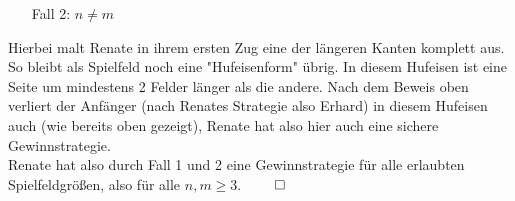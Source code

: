 \documentclass[12pt,a4paper,oneside]{article}
\begin{document}
\begin{itemize}
	\item[Fall 2:] $n\neq m$
\end{itemize}
Hierbei malt Renate in ihrem ersten Zug eine der längeren Kanten komplett aus. So bleibt als Spielfeld noch eine "Hufeisenform" übrig. In diesem Hufeisen ist eine Seite um mindestens 2 Felder länger als die andere. Nach dem Beweis oben verliert der Anfänger (nach Renates Strategie also Erhard) in diesem Hufeisen auch (wie bereits oben gezeigt), Renate hat also hier auch eine sichere Gewinnstrategie. \\[10pt]
Renate hat also durch Fall 1 und 2 eine Gewinnstrategie für alle erlaubten Spielfeldgrößen, also für alle $n, m \geq 3$. $\qed$
\end{document}
